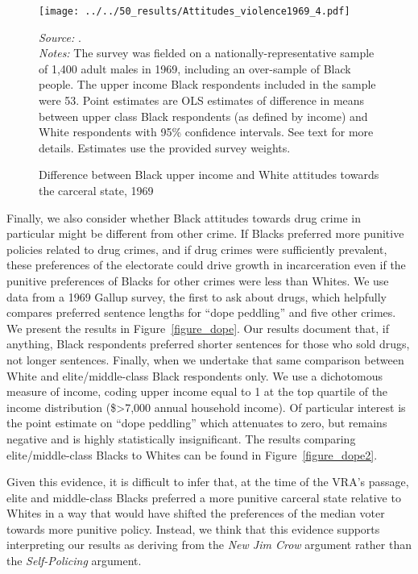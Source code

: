 \documentclass[12pt]{article}
\begin{document}
\begin{figure}[h!]
 \begin{center}
 \caption{Difference between Black upper income and White attitudes towards the carceral state, 1969}
 \small
		 \texttt{[image: ../../50\_results/Attitudes\_violence1969\_4.pdf]}
 \label{figure_attitudes_class2}
 	\end{center}
 	{\scriptsize{\emph{Source:} \cite{Violence1969}. }} \\
	{\scriptsize{\emph{Notes:} The survey was fielded on a nationally-representative sample of 1,400 adult males in 1969, including an over-sample of Black people.  The upper income Black respondents included in the sample were 53.   Point estimates are OLS estimates of difference in means between upper class Black respondents (as defined by income) and White respondents with 95\% confidence intervals.  See text for more details.  Estimates use the provided survey weights.  \singlespacing }}
\end{figure} \normalsize


Finally, we also consider whether Black attitudes towards drug crime in particular might be different from other crime.  If Blacks preferred more punitive policies related to drug crimes, and if drug crimes were sufficiently prevalent, these preferences of the electorate could drive growth in incarceration even if the punitive preferences of Blacks for other crimes were less than Whites.  We use data from a 1969 Gallup survey, the first to ask about drugs, which helpfully compares preferred sentence lengths for ``dope peddling'' and five other crimes.  We present the results in Figure~\ref{figure_dope}. Our results document that, if anything, Black respondents preferred shorter sentences for those who sold drugs, not longer sentences.  Finally, when we undertake that same comparison between White and elite/middle-class Black respondents only.  We use a dichotomous measure of income, coding upper income equal to 1 at the top quartile of the income distribution (\$>7,000 annual household income).  Of particular interest is the point estimate on ``dope peddling'' which attenuates to zero, but remains negative and is highly statistically insignificant.  The results comparing elite/middle-class Blacks to Whites can be found in Figure~\ref{figure_dope2}.

Given this evidence, it is difficult to infer that, at the time of the VRA's passage, elite and middle-class Blacks preferred a more punitive carceral state relative to Whites in a way that would have shifted the preferences of the median voter towards more punitive policy.  Instead, we think that this evidence supports interpreting our results as deriving from the \emph{New Jim Crow} argument rather than the \emph{Self-Policing} argument.
\end{document}
